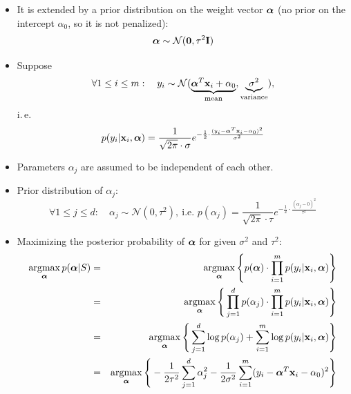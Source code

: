 	\begin{itemize}
		\item It is extended by a prior distribution on the weight vector $\bm{\mathrm{\alpha}}$ (no prior on the intercept $\alpha_0$, so it is not penalized):
		      \begin{displaymath}
			      \bm{\mathrm{\alpha}} \sim {\cal N}(\bm{\mathrm{0}}, \tau^2 \mathbf{I})
		      \end{displaymath}
		\item Suppose
		      \begin{displaymath}
			      \forall 1 \le i \le m: \quad y_i
			      \sim \mathcal{N}(\underbrace{\bm{\mathrm{\alpha}}^T \bm{\mathrm{x}}_i + \alpha_0}_\text{mean}, \underbrace{\sigma^2}_\text{variance}),
		      \end{displaymath}
		      i.\,e.\
		      \begin{displaymath}
			      p(y_i|\bm{\mathrm{x}}_i,\bm{\mathrm{\alpha}}) = \frac{1}{\sqrt{2 \pi} \cdot \sigma} e^{-\frac{1}{2} \cdot \frac{(y_i - \bm{\mathrm{\alpha}}^T \bm{\mathrm{x}}_i - \alpha_0)^2}{\sigma^2}}
  \end{displaymath}
		\item Parameters $\alpha_j$ are assumed to be independent of each other.
		\item Prior distribution of $\alpha_j$:
		      \begin{displaymath}
			      \forall 1 \le j \le d: \quad \alpha_j
			      \sim \mathcal{N}(0, \tau^2)
			      ,\ \text{i.e. } p(\alpha_j) = \frac{1}{\sqrt{2 \pi} \cdot \tau} e^{-\frac{1}{2} \cdot \frac{(\alpha_j - 0)^2}{\tau^2}}
		      \end{displaymath}
		\item {Maximizing the posterior probability of $\bm{\mathrm{\alpha}}$ for given $\sigma^2$ and $\tau^2$:}
		      \footnotesize
		      \begin{eqnarray*}
			      \argmax_{\vect{\alpha}} p(\vect{\alpha}|S) 
			      &=& \argmax_{\vect{\alpha}} \Bigg\{ p(\vect{\alpha}) \cdot \prod_{i=1}^m p(y_i | \vect x_i, \vect{\alpha}) \Bigg\} \\ 
			      &=& \argmax_{\vect{\alpha}} \Bigg\{ \prod_{j=1}^d p(\alpha_j) \cdot \prod_{i=1}^m p(y_i | \vect x_i, \vect{\alpha}) \Bigg\} \\ 
			      &=& \argmax_{\vect{\alpha}} \Bigg\{ \sum_{j=1}^d \log p(\alpha_j) + \sum_{i=1}^m \log p(y_i | \vect x_i, \vect{\alpha}) \Bigg\} \\ 
			      &=& \argmax_{\vect{\alpha}} \Bigg\{ - \frac{1}{2 \tau^2} \sum_{j=1}^d \alpha_j^2 - \frac{1}{2 \sigma^2} \sum_{i=1}^m (y_i - \vect{\alpha}^T \vect{x}_i - \alpha_0)^2 \Bigg\} \\ 

\end{eqnarray*}
\end{itemize}
